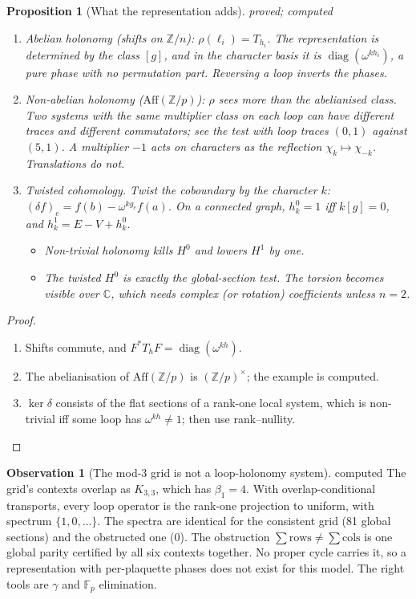 \documentclass[11pt]{article}
\newtheorem{proposition}[theorem]{Proposition}
\theoremstyle{definition}
\newtheorem{observation}[theorem]{Observation}
\theoremstyle{remark}
\newcommand{\Z}{\mathbb{Z}}
\newcommand{\F}{\mathbb{F}}
\newcommand{\Aff}{\mathrm{Aff}}
\newcommand{\st}[1]{\textsf{\small\color{gray}#1}}
\begin{document}
\begin{proposition}[What the representation adds]\label{prop:mono}\st{proved; computed}
\begin{enumerate}
  \item \emph{Abelian} holonomy (shifts on $\Z/n$): $\rho(\ell_i)=T_{h_i}$. The representation is determined by the class $[g]$, and in the character basis it is $\operatorname{diag}(\omega^{k h_i})$, a pure phase with no permutation part. Reversing a loop inverts the phases.
  \item \emph{Non-abelian} holonomy ($\Aff(\Z/p)$): $\rho$ sees more than the abelianised class. Two systems with the same multiplier class on each loop can have different traces and different commutators; see the test with loop traces $(0,1)$ against $(5,1)$. A multiplier $-1$ acts on characters as the reflection $\chi_k\mapsto\chi_{-k}$. Translations do not.
  \item \emph{Twisted cohomology.} Twist the coboundary by the character $k$: $(\delta f)_e=f(b)-\omega^{kg_e}f(a)$. On a connected graph, $h^0_k=1$ iff $k[g]=0$, and $h^1_k=E-V+h^0_k$.
  \begin{itemize}
    \item Non-trivial holonomy kills $H^0$ and \emph{lowers} $H^1$ by one.
    \item The twisted $H^0$ is exactly the global-section test. The torsion becomes visible over $\mathbb C$, which needs complex (or rotation) coefficients unless $n=2$.
  \end{itemize}
\end{enumerate}
\end{proposition}
\begin{proof}
\begin{enumerate}
  \item Shifts commute, and $F^*T_hF=\operatorname{diag}(\omega^{kh})$.
  \item The abelianisation of $\Aff(\Z/p)$ is $(\Z/p)^\times$; the example is computed.
  \item $\ker\delta$ consists of the flat sections of a rank-one local system, which is non-trivial iff some loop has $\omega^{kh}\neq1$; then use rank--nullity.
\end{enumerate}
\end{proof}

\begin{observation}[The mod-3 grid is not a loop-holonomy system]\label{obs:grid}\st{computed}
The grid's contexts overlap as $K_{3,3}$, which has $\beta_1=4$. With overlap-conditional transports, every loop operator is the rank-one projection to uniform, with spectrum $\{1,0,\dots\}$. The spectra are identical for the consistent grid (81 global sections) and the obstructed one (0). The obstruction $\sum\text{rows}\neq\sum\text{cols}$ is one global parity certified by all six contexts together. No proper cycle carries it, so a representation with per-plaquette phases does not exist for this model. The right tools are $\gamma$ and $\F_p$ elimination.
\end{observation}
\end{document}
